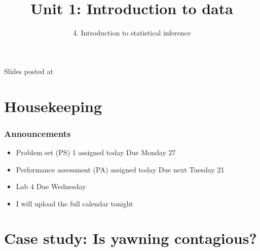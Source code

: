 \documentclass[slidestop,compress,mathserif,11pt,t,professionalfonts,xcolor=table]{beamer}
\title{Unit 1: Introduction to data}
\subtitle{4. Introduction to statistical inference}
\author{\CourseName}
\date{}
\institute{\InstituteName}
\begin{document}



\begin{frame}[plain]

\titlepage

\vfill

{\scriptsize {} \hfill Slides posted at  \webURL{\CourseSite}}

\addtocounter{framenumber}{-1} 

\end{frame}


\section{Housekeeping}


\begin{frame}
\frametitle{Announcements}

\begin{itemize}

\item Problem set (PS) 1 assigned today Due  Monday 27 

\item Performance assessment (PA) assigned today Due next Tuesday 21

\item Lab 4 Due Wednesday

\item I will upload the full calendar tonight
\end{itemize}

\end{frame}


\section{Case study: Is yawning contagious?}

\end{document}
